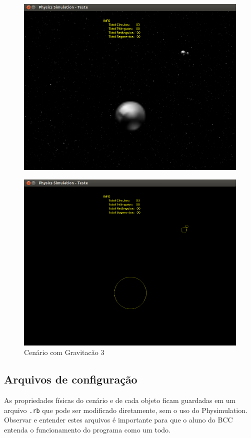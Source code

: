 \begin{figure}[H]
	\centering
	\includegraphics[scale=0.4]{images/gravitacao-sol-lua.png}
\end{figure}
\begin{figure}[H]
	\centering
	\includegraphics[scale=0.4]{images/gravitacao-sol-luaE.png}
	\caption{Cenário com Gravitacão 3}
\end{figure}

\subsection{Arquivos de configuração}
As propriedades físicas do cenário e de cada objeto ficam guardadas em um arquivo {\tt *.rb} que pode ser modificado diretamente, sem o uso do Physimulation. Observar e entender estes arquivos é importante para que o aluno do BCC entenda o funcionamento do programa como um todo. \\


